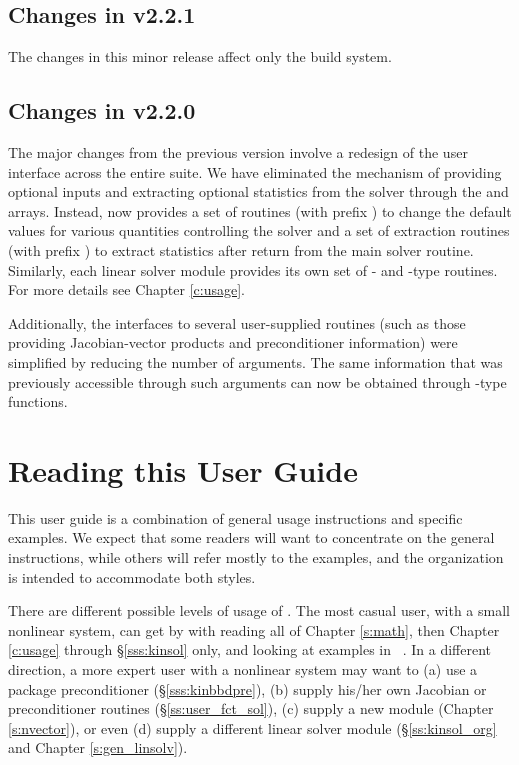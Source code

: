 \subsection*{Changes in v2.2.1}

The changes in this minor {\sundials} release affect only the build system.

\subsection*{Changes in v2.2.0}

The major changes from the previous version involve a redesign of
the user interface across the entire {\sundials} suite. We have
eliminated the mechanism of providing optional inputs and
extracting optional statistics from the solver through the
 and  arrays. Instead, {\kinsol} now provides a
set of routines (with prefix ) to change the default
values for various quantities controlling the solver and a set of
extraction routines (with prefix ) to extract
statistics after return from the main solver routine. Similarly,
each linear solver module provides its own set of {-} and
{-type} routines. For more details see Chapter \ref{c:usage}.

Additionally, the interfaces to several user-supplied routines
(such as those providing Jacobian-vector products and
preconditioner information) were simplified by reducing the number
of arguments. The same information that was previously accessible
through such arguments can now be obtained through {-type}
functions.

\section{Reading this User Guide}\label{ss:reading}

This user guide is a combination of general usage instructions and specific
examples. We expect that some readers will want to concentrate on the general
instructions, while others will refer mostly to the examples, and the
organization is intended to accommodate both styles.

There are different possible levels of usage of {\kinsol}. The most casual
user, with a small nonlinear system, can get by with reading all of Chapter
\ref{s:math}, then Chapter \ref{c:usage} through \S\ref{sss:kinsol} only, and
looking at examples in ~\cite{kinsol2.4.0_ex}. In a different direction, a
more expert user with a nonlinear system may want to (a) use a package
preconditioner (\S\ref{sss:kinbbdpre}), (b) supply his/her own Jacobian or
preconditioner routines (\S\ref{ss:user_fct_sol}), (c) supply a new
{\nvector} module (Chapter \ref{s:nvector}), or even (d) supply a different
linear solver module (\S\ref{ss:kinsol_org} and Chapter \ref{s:gen_linsolv}).


